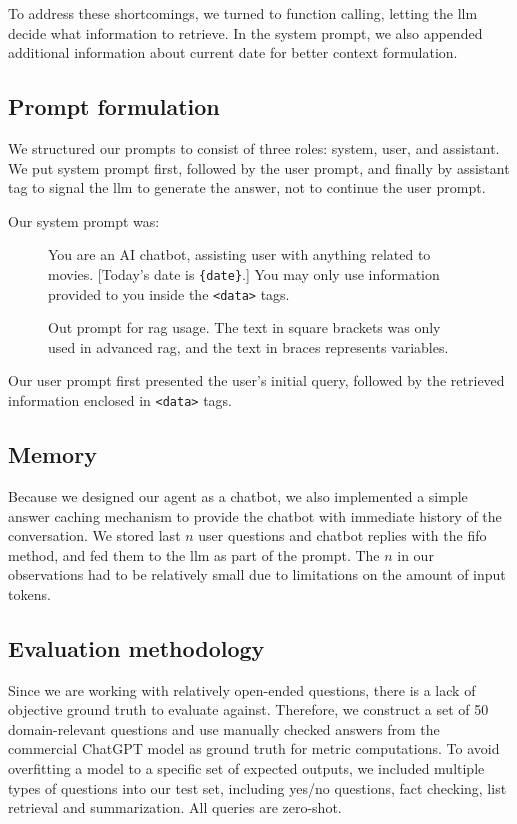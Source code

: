 \documentclass[fleqn,moreauthors,10pt]{ds_report}
\begin{document}
To address these shortcomings, we turned to function calling, letting the \ac{llm} decide what information to retrieve. In the system prompt, we also appended additional information about current date for better context formulation.

\subsection*{Prompt formulation}

We structured our prompts to consist of three roles: system, user, and assistant. We put system prompt first, followed by the user prompt, and finally by assistant tag to signal the \ac{llm} to generate the answer, not to continue the user prompt.

Our system prompt was:

\begin{figure}[h!]
	\begin{tcolorbox}
		You are an AI chatbot, assisting user with anything related to movies. [Today's date is \verb|{date}|.] You may only use information provided to you inside the \verb|<data>| tags.
	\end{tcolorbox}
	\caption{Out prompt for \ac{rag} usage. The text in square brackets was only used in advanced \ac{rag}, and the text in braces represents variables.}
\end{figure}

Our user prompt first presented the user's initial query, followed by the retrieved information enclosed in \verb|<data>| tags.

\subsection*{Memory}

Because we designed our agent as a chatbot, we also implemented a simple answer caching mechanism to provide the chatbot with immediate history of the conversation. We stored last $n$ user questions and chatbot replies with the \ac{fifo} method, and fed them to the \ac{llm} as part of the prompt. The $n$ in our observations had to be relatively small due to limitations on the amount of input tokens.


\subsection*{Evaluation methodology}

Since we are working with relatively open-ended questions, there is a lack of objective ground truth to evaluate against. Therefore, we construct a set of 50 domain-relevant questions and use manually checked answers from the commercial ChatGPT model as ground truth for metric computations. To avoid overfitting a model to a specific set of expected outputs, we included multiple types of questions into our test set, including yes/no questions, fact checking, list retrieval and summarization. All queries are zero-shot.
\end{document}
